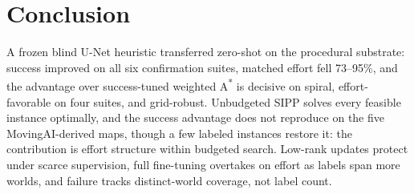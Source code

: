 \documentclass[letterpaper]{article} %
\begin{document}
\section{Conclusion}

A frozen blind U-Net heuristic transferred zero-shot on the procedural substrate: success improved on all six confirmation suites, matched effort fell 73--95\%, and the advantage over success-tuned weighted A\textsuperscript{*} is decisive on spiral, effort-favorable on four suites, and grid-robust. Unbudgeted SIPP solves every feasible instance optimally, and the success advantage does not reproduce on the five MovingAI-derived maps, though a few labeled instances restore it: the contribution is effort structure within budgeted search. Low-rank updates protect under scarce supervision, full fine-tuning overtakes on effort as labels span more worlds, and failure tracks distinct-world coverage, not label count.



\end{document}
